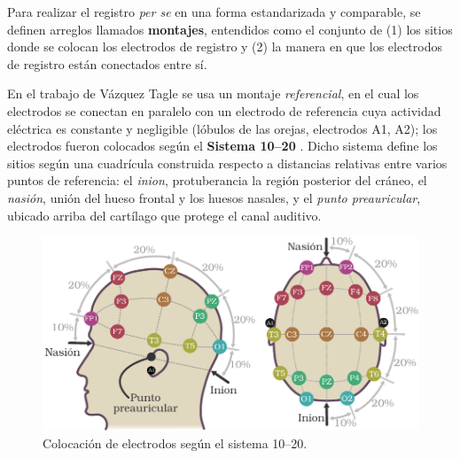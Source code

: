 Para realizar el registro \textit{per se} en una forma estandarizada y comparable, se definen
arreglos llamados \textbf{montajes}, entendidos como el conjunto de (1)
los sitios donde se colocan los electrodos de registro y (2)
la manera en que los electrodos de registro están conectados entre sí.

En el trabajo de Vázquez Tagle \cite{VazquezTagle16} se usa un montaje \textit{referencial}, en el 
cual los electrodos se conectan en paralelo con un electrodo de referencia cuya actividad eléctrica 
es constante y negligible (lóbulos de las orejas, electrodos A1, A2);
los electrodos fueron colocados según el \textbf{Sistema 10--20} \cite{Jasper58,Klem99}.
%
Dicho sistema define los sitios según una cuadrícula construida respecto a distancias relativas 
entre varios puntos de referencia: el \textit{inion}, protuberancia la región posterior del cráneo, 
el \textit{nasión}, unión del hueso frontal y los huesos nasales, y el \textit{punto preauricular}, 
ubicado arriba del cartílago que protege el canal auditivo.


\begin{figure}
\centering
\includegraphics[width=\linewidth]{./img_diagramas/cabeza_proporcionada_color_v2.pdf} 
\caption{Colocación de electrodos según el sistema 10--20.
}
\label{img1020}
\end{figure}


